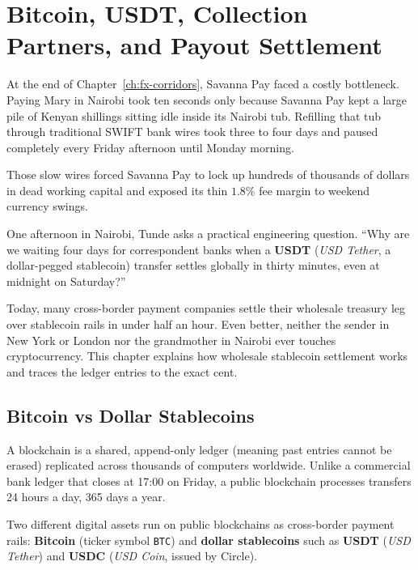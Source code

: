 \chapter{Bitcoin, USDT, Collection Partners, and Payout Settlement}
\label{ch:btc-usdt-settlement}
\chapterline

At the end of Chapter~\ref{ch:fx-corridors}, Savanna Pay faced a costly bottleneck. Paying Mary in Nairobi took ten seconds only because Savanna Pay kept a large pile of Kenyan shillings sitting idle inside its Nairobi tub. Refilling that tub through traditional SWIFT bank wires took three to four days and paused completely every Friday afternoon until Monday morning.

Those slow wires forced Savanna Pay to lock up hundreds of thousands of dollars in dead working capital and exposed its thin $1.8\%$ fee margin to weekend currency swings.

One afternoon in Nairobi, Tunde asks a practical engineering question. ``Why are we waiting four days for correspondent banks when a \textbf{USDT} (\emph{USD Tether}, a dollar-pegged stablecoin) transfer settles globally in thirty minutes, even at midnight on Saturday?''

Today, many cross-border payment companies settle their wholesale treasury leg over stablecoin rails in under half an hour. Even better, neither the sender in New York or London nor the grandmother in Nairobi ever touches cryptocurrency. This chapter explains how wholesale stablecoin settlement works and traces the ledger entries to the exact cent.

\section{Bitcoin vs Dollar Stablecoins}

A blockchain is a shared, append-only ledger (meaning past entries cannot be erased) replicated across thousands of computers worldwide. Unlike a commercial bank ledger that closes at 17:00 on Friday, a public blockchain processes transfers 24 hours a day, 365 days a year.

Two different digital assets run on public blockchains as cross-border payment rails: \textbf{Bitcoin} (ticker symbol \texttt{BTC}) and \textbf{dollar stablecoins} such as \textbf{USDT} (\emph{USD Tether}) and \textbf{USDC} (\emph{USD Coin}, issued by Circle).

